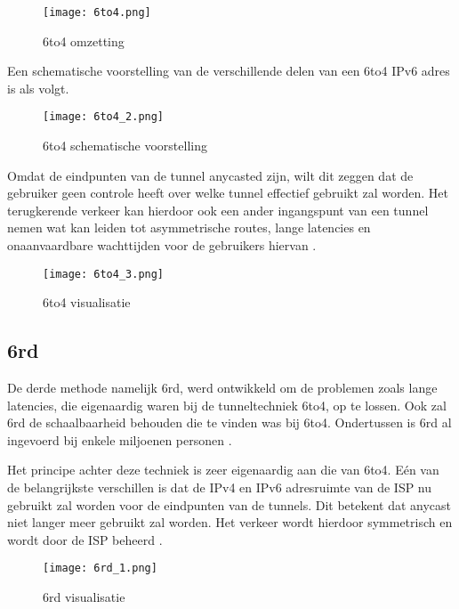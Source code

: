 \begin{figure}
\texttt{[image: 6to4.png]}
\centering
\caption{6to4 omzetting \autocite{RIPE2016}}
\centering
\end{figure}

Een schematische voorstelling van de verschillende delen van een 6to4 IPv6 adres is als volgt.

\begin{figure}
\texttt{[image: 6to4\_2.png]}
\centering
\caption{6to4 schematische voorstelling \autocite{RIPE2016}}
\centering
\end{figure}

Omdat de eindpunten van de tunnel anycasted zijn, wilt dit zeggen dat de gebruiker geen controle heeft over welke tunnel effectief gebruikt zal worden. Het terugkerende verkeer kan hierdoor ook een ander ingangspunt van een tunnel nemen wat kan leiden tot asymmetrische routes, lange latencies en onaanvaardbare wachttijden voor de gebruikers hiervan \autocite{RIPE2016}.

\begin{figure}
\texttt{[image: 6to4\_3.png]}
\centering
\caption{6to4 visualisatie \autocite{RIPE2016}}
\centering
\end{figure}

\subsection{6rd}

De derde methode namelijk 6rd, werd ontwikkeld om de problemen zoals lange latencies, die eigenaardig waren bij de tunneltechniek 6to4, op te lossen. Ook zal 6rd de schaalbaarheid behouden die te vinden was bij 6to4. Ondertussen is 6rd al ingevoerd bij enkele miljoenen personen \autocite{RIPE2016}. 

Het principe achter deze techniek is zeer eigenaardig aan die van 6to4. Eén van de belangrijkste verschillen is dat de IPv4 en IPv6 adresruimte van de ISP nu gebruikt zal worden voor de eindpunten van de tunnels. Dit betekent dat anycast niet langer meer gebruikt zal worden. Het verkeer wordt hierdoor symmetrisch en wordt door de ISP beheerd \autocite{RIPE2016}.

\begin{figure}
\texttt{[image: 6rd\_1.png]}
\centering
\caption{6rd visualisatie \autocite{RIPE2016}}
\centering
\end{figure}

